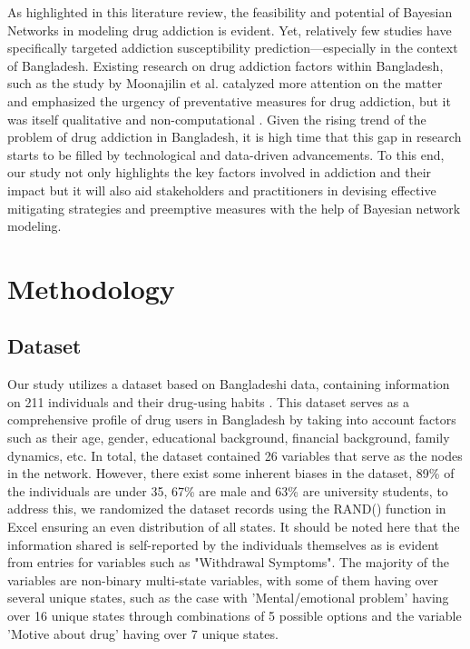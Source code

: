 \documentclass[conference]{IEEEtran}
\begin{document}
As highlighted in this literature review, the feasibility and potential of Bayesian Networks in modeling drug addiction is evident. Yet, relatively few studies have specifically targeted addiction susceptibility prediction—especially in the context of Bangladesh. Existing research on drug addiction factors within Bangladesh, such as the study by Moonajilin et al. catalyzed more attention on the matter and emphasized the urgency of preventative measures for drug addiction, but it was itself qualitative and non-computational \cite{PMC8294555}. Given the rising trend of the problem of drug addiction in Bangladesh, it is high time that this gap in research starts to be filled by technological and data-driven advancements. To this end, our study not only highlights the key factors involved in addiction and their impact but it will also aid stakeholders and practitioners in devising effective mitigating strategies and preemptive measures with the help of Bayesian network modeling. 

\section{Methodology}
\subsection{Dataset}
Our study utilizes a dataset based on Bangladeshi data, containing information on 211 individuals and their drug-using habits \cite{dataset}. This dataset serves as a comprehensive profile of drug users in Bangladesh by taking into account factors such as their age, gender, educational background, financial background, family dynamics, etc. In total, the dataset contained 26 variables that serve as the nodes in the network. However, there exist some inherent biases in the dataset, 89\% of the individuals are under 35, 67\% are male and 63\% are university students,  to address this, we randomized the dataset records using the RAND() function in Excel ensuring an even distribution of all states. It should be noted here that the information shared is self-reported by the individuals themselves as is evident from entries for variables such as "Withdrawal Symptoms". The majority of the variables are non-binary multi-state variables, with some of them having over several unique states, such as the case with 'Mental/emotional problem' having over 16 unique states through combinations of 5 possible options and the variable 'Motive about drug' having over 7 unique states. 
\end{document}
